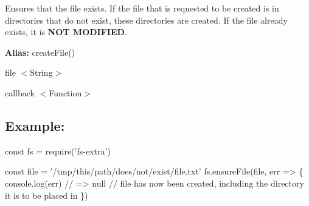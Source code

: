 Ensures that the file exists. If the file that is requested to be created is in directories that do not exist, these directories are created. If the file already exists, it is {\bfseries N\+OT M\+O\+D\+I\+F\+I\+ED}.

{\bfseries Alias\+:} {\ttfamily create\+File()}


\begin{DoxyItemize}
\item {\ttfamily file} {\ttfamily $<$String$>$}
\item {\ttfamily callback} {\ttfamily $<$Function$>$}
\end{DoxyItemize}

\subsection*{Example\+:}


\begin{DoxyCode}
const fs = require('fs-extra')

const file = '/tmp/this/path/does/not/exist/file.txt'
fs.ensureFile(file, err => \{
  console.log(err) // => null
  // file has now been created, including the directory it is to be placed in
\})
\end{DoxyCode}
 